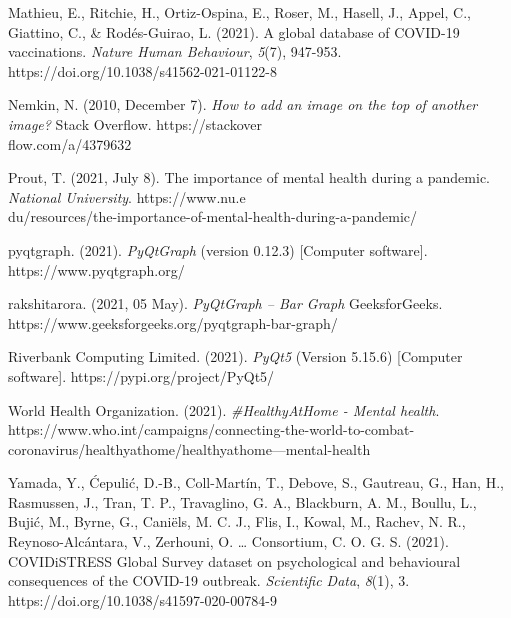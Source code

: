 \documentclass[fontsize=11pt]{article}
\begin{document}
    \hangindent=0.7cm \noindent
    Mathieu, E., Ritchie, H., Ortiz-Ospina, E., Roser, M., Hasell, J., Appel, C., Giattino, C., \& Rodés-Guirao, L. (2021). A global database of COVID-19 vaccinations. \textit{Nature Human Behaviour}, \textit{5}(7), 947-953. \\
    https://doi.org/10.1038/s41562-021-01122-8

    \hangindent=0.7cm \noindent
    Nemkin, N. (2010, December 7). \textit{How to add an image on the top of another image?} Stack Overflow.
    https://stackover\\flow.com/a/4379632

    \hangindent=0.7cm \noindent
    Prout, T. (2021, July 8). The importance of mental health during a pandemic. \textit{National University}.
    https://www.nu.e\\du/resources/the-importance-of-mental-health-during-a-pandemic/

    \hangindent=0.7cm \noindent
    pyqtgraph. (2021). \textit{PyQtGraph} (version 0.12.3) [Computer software].
    https://www.pyqtgraph.org/

    \hangindent=0.7cm \noindent
    rakshitarora. (2021, 05 May). \textit{PyQtGraph – Bar Graph} GeeksforGeeks.
    https://www.geeksforgeeks.org/pyqtgraph-bar-graph/

    \hangindent=0.7cm \noindent
    Riverbank Computing Limited. (2021). \textit{PyQt5} (Version 5.15.6) [Computer software].
    https://pypi.org/project/PyQt5/

    \hangindent=0.7cm \noindent
    World Health Organization. (2021). \textit{\#HealthyAtHome - Mental health}.
    https://www.who.int/campaigns/connecting-the-world-to-combat-coronavirus/healthyathome/healthyathome---mental-health

    \hangindent=0.7cm \noindent
    Yamada, Y., Ćepulić, D.-B., Coll-Martín, T., Debove, S., Gautreau, G., Han, H., Rasmussen, J., Tran, T. P., Travaglino, G. A., Blackburn, A. M., Boullu, L., Bujić, M., Byrne, G., Caniëls, M. C. J., Flis, I., Kowal, M., Rachev, N. R., Reynoso-Alcántara, V., Zerhouni, O. … Consortium, C. O. G. S. (2021). COVIDiSTRESS Global Survey dataset on psychological and behavioural consequences of the COVID-19 outbreak. \textit{Scientific Data}, \textit{8}(1), 3.
    https://doi.org/10.1038/s41597-020-00784-9
\end{document}
